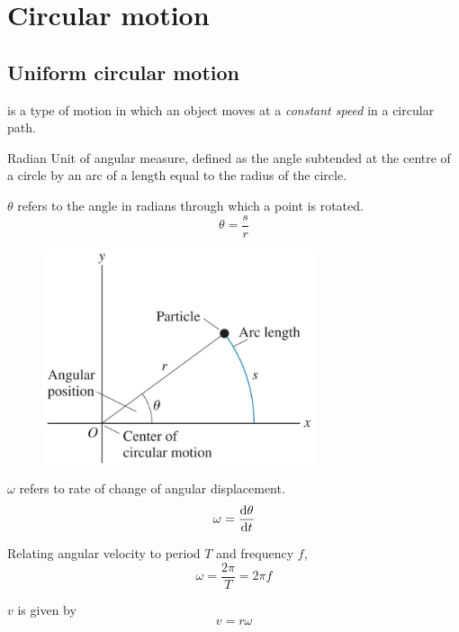 \section{Circular motion}
\subsection{Uniform circular motion}
 is a type of motion in which an object moves at a \textit{constant speed} in a circular path.

\begin{defn}{Radian}{}
Unit of angular measure, defined as the angle subtended at the centre of a circle by an arc of a length equal to the radius of the circle.
\end{defn}

 $\theta$ refers to the angle in radians through which a point is rotated.
\begin{equation} \theta = \frac{s}{r} \end{equation}

\begin{figure}[H]
    \centering
    \includegraphics[width=8cm]{images/Angular_displacement.png}
\end{figure}

 $\omega$ refers to rate of change of angular displacement.
\begin{equation} \omega = \dv{\theta}{t} \end{equation}

Relating angular velocity to period $T$ and frequency $f$, 
\begin{equation} \omega = \frac{2\pi}{T} = 2\pi f \end{equation}

 $v$ is given by 
\begin{equation} v = r\omega \end{equation}


